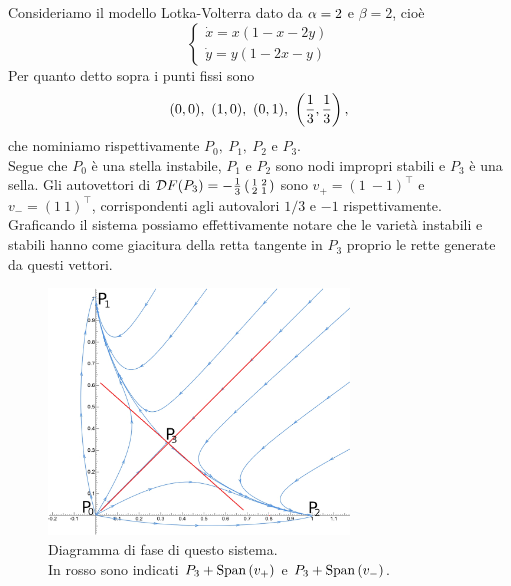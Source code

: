 \begin{example}
Consideriamo il modello Lotka-Volterra dato da $\alpha=2$ e $\beta=2$, cio\`e
\[\begin{cases}
\dot x=x(1-x-2y)\\
\dot y=y(1-2x-y)
\end{cases}\]
Per quanto detto sopra i punti fissi sono
\[(0,0),\ (1,0),\ (0,1),\ \pa{\frac13,\frac13},\]
che nominiamo rispettivamente $P_0,\ P_1,\ P_2$ e $P_3$.\\
Segue che $P_0$ \`e una stella instabile, $P_1$ e $P_2$ sono nodi impropri stabili e $P_3$ \`e una sella.
Gli autovettori di $\mathcal{D} F(P_3)=-\frac13\left({\begin{smallmatrix}1 &2\\2&1\end{smallmatrix}}\right)$ sono $v_+=(1\ -1)^\top$ e $v_-=(1\ 1)^\top$, corrispondenti agli autovalori $1/3$ e $-1$ rispettivamente. Graficando il sistema possiamo effettivamente notare che le variet\`a instabili e stabili hanno come giacitura della retta tangente in $P_3$ proprio le rette generate da questi vettori.
\begin{figure}[!htb]
    \centering
    \includegraphics[width=8cm]{Immagini/Lotka-VolterraVarietaStabili.jpg}
    \caption{Diagramma di fase di questo sistema.\\
    In rosso sono indicati $P_3+\mathrm{Span}\,(v_+)$ e $P_3+\mathrm{Span}\,(v_-)$.}
\end{figure}

\end{example}

